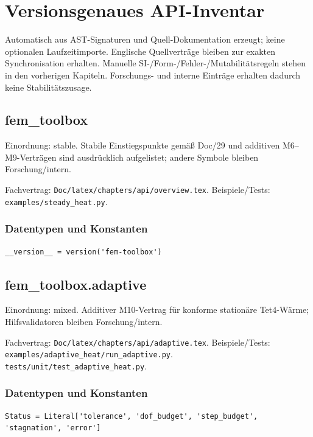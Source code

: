 \chapter{Versionsgenaues API-Inventar}
\label{api:inventory}
\begingroup\raggedright
\lstset{basicstyle=\scriptsize\ttfamily,breaklines=true,breakatwhitespace=false}
Automatisch aus AST-Signaturen und Quell-Dokumentation erzeugt; keine optionalen Laufzeitimporte. Englische Quellverträge bleiben zur exakten Synchronisation erhalten. Manuelle SI-/Form-/Fehler-/Mutabilitätsregeln stehen in den vorherigen Kapiteln. Forschungs- und interne Einträge erhalten dadurch keine Stabilitätszusage.
\section{fem\_toolbox}
Einordnung: stable. Stabile Einstiegspunkte gemäß Doc/29 und additiven M6–M9-Verträgen sind ausdrücklich aufgelistet; andere Symbole bleiben Forschung/intern.
\par Fachvertrag: \nolinkurl{Doc/latex/chapters/api/overview.tex}. Beispiele/Tests:
\nolinkurl{examples/steady_heat.py}.
\subsection*{Datentypen und Konstanten}
\begin{lstlisting}
__version__ = version('fem-toolbox')
\end{lstlisting}
\section{fem\_toolbox.adaptive}
Einordnung: mixed. Additiver M10-Vertrag für konforme stationäre Tet4-Wärme; Hilfsvalidatoren bleiben Forschung/intern.
\par Fachvertrag: \nolinkurl{Doc/latex/chapters/api/adaptive.tex}. Beispiele/Tests:
\nolinkurl{examples/adaptive_heat/run_adaptive.py}.
\nolinkurl{tests/unit/test_adaptive_heat.py}.
\subsection*{Datentypen und Konstanten}
\begin{lstlisting}
Status = Literal['tolerance', 'dof_budget', 'step_budget', 'stagnation', 'error']
\end{lstlisting}
